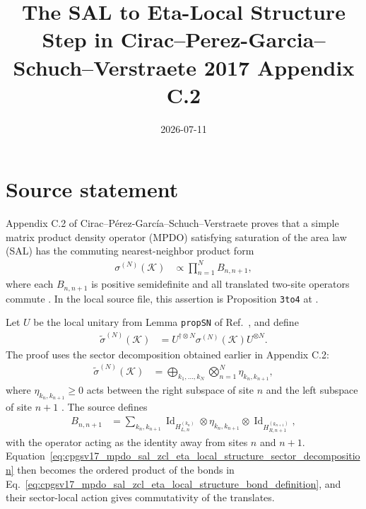 \documentclass{article}
\title{The SAL to Eta-Local Structure Step in
Cirac--Perez-Garcia--Schuch--Verstraete 2017 Appendix C.2}
\author{}
\date{2026-07-11}
\begin{document}
\maketitle
{}

\section{Source statement}

Appendix C.2 of Cirac--P\'erez-Garc\'ia--Schuch--Verstraete proves that a
simple matrix product density operator (MPDO) satisfying saturation of the area law
(SAL) has the commuting nearest-neighbor product form
\begin{align}
    \sigma^{(N)}(\mathcal K)
        &\propto \prod_{n=1}^{N} B_{n,n+1},
    \label{eq:cpgsv17_mpdo_sal_zcl_eta_local_structure_source_product_form}
\end{align}
where each $B_{n,n+1}$ is positive semidefinite and all translated two-site
operators commute \cite[Appendix~C.2, Proposition~C.8]{Cirac2016MPDO_arXiv}.
In the local source file, this assertion is Proposition \texttt{3to4} at
.

Let $U$ be the local unitary from Lemma \texttt{propSN} of
Ref.~\cite{Cirac2016MPDO_arXiv}, and define
\begin{align}
    \widetilde{\sigma}^{(N)}(\mathcal K)
        &=
        U^{\dagger\otimes N}
        \sigma^{(N)}(\mathcal K)
        U^{\otimes N}.
    \label{eq:cpgsv17_mpdo_sal_zcl_eta_local_structure_transformed_density}
\end{align}
The proof uses the sector decomposition obtained earlier in Appendix C.2:
\begin{align}
    \widetilde{\sigma}^{(N)}(\mathcal K)
        &=
        \bigoplus_{k_1,\ldots,k_N}
        \bigotimes_{n=1}^{N}\eta_{k_n,k_{n+1}},
    \label{eq:cpgsv17_mpdo_sal_zcl_eta_local_structure_sector_decomposition}
\end{align}
where $\eta_{k_n,k_{n+1}}\geq 0$ acts between the right subspace of site $n$
and the left subspace of site $n+1$
\cite[Appendix~C.2]{Cirac2016MPDO_arXiv}. The source defines
\begin{align}
    B_{n,n+1}
        &=
        \sum_{k_n,k_{n+1}}
        \operatorname{Id}_{H_{L,n}^{(k_n)}}
        \otimes \eta_{k_n,k_{n+1}}
        \otimes
        \operatorname{Id}_{H_{R,n+1}^{(k_{n+1})}},
    \label{eq:cpgsv17_mpdo_sal_zcl_eta_local_structure_bond_definition}
\end{align}
with the operator acting as the identity away from sites $n$ and $n+1$.
Equation~\ref{eq:cpgsv17_mpdo_sal_zcl_eta_local_structure_sector_decomposition}
then becomes the ordered product of the bonds in
Eq.~\ref{eq:cpgsv17_mpdo_sal_zcl_eta_local_structure_bond_definition}, and
their sector-local action gives commutativity of the translates.
\end{document}
